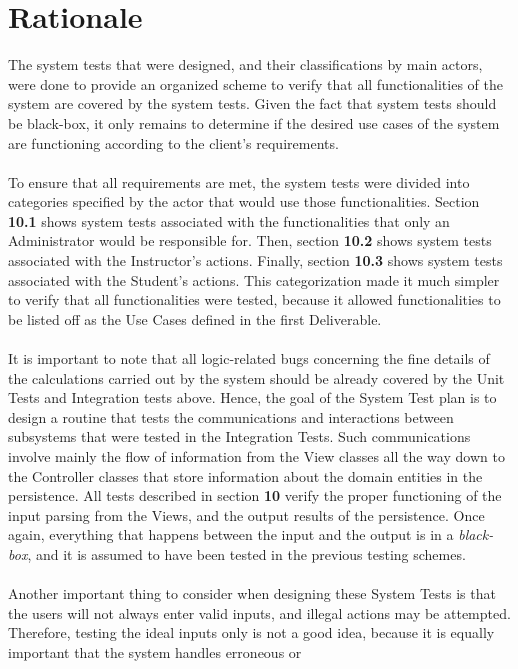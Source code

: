 \documentclass[12pt]{report}
\begin{document}
\section{Rationale}
The system tests that were designed, and their classifications by main actors, were done to provide
an organized scheme to verify that all functionalities of the system are covered by the system
tests. Given the fact that system tests should be black-box, it only remains to determine if the
desired use cases of the system are functioning according to the client's requirements.\\\\
To ensure that all requirements are met, the system tests were divided into categories specified by
the actor that would use those functionalities. Section \textbf{10.1} shows system tests associated
with the functionalities that only an Administrator would be responsible for. Then, section 
\textbf{10.2} shows system tests associated with the Instructor's actions. Finally, section
\textbf{10.3} shows system tests associated with the Student's actions. This categorization made it
much simpler to verify that all functionalities were tested, because it allowed functionalities to
be listed off as the Use Cases defined in the first Deliverable.\\\\
It is important to note that all logic-related bugs concerning the fine details of the calculations
carried out by the system should be already covered by the Unit Tests and Integration tests above.
Hence, the goal of the System Test plan is to design a routine that tests the communications and
interactions between subsystems that were tested in the Integration Tests. Such communications
involve mainly the flow of information from the View classes all the way down to the Controller
classes that store information about the domain entities in the persistence. All tests described in
section \textbf{10} verify the proper functioning of the input parsing from the Views, and the output
results of the persistence. Once again, everything that happens between the input and the output is
in a \textit{black-box}, and it is assumed to have been tested in the previous testing schemes.\\\\
Another important thing to consider when designing these System Tests is that the users will not
always enter valid inputs, and illegal actions may be attempted. Therefore, testing the ideal inputs
only is not a good idea, because it is equally important that the system handles erroneous or
\end{document}
